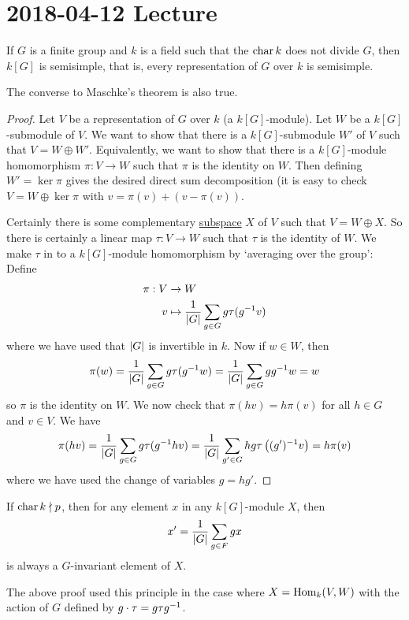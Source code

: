 \section{2018-04-12 Lecture}

\begin{thm}
	If $G$ is a finite group and $k$ is a field such that the $\operatorname{char} k$ does not divide $G$, then $k[G]$ is semisimple, that is, every representation of $G$ over $k$ is semisimple.
\end{thm}

\begin{rmk}
	The converse to Maschke's theorem is also true.
\end{rmk}

\begin{proof}
	Let $V$ be a representation of $G$ over $k$ (a $k[G]$-module).
	Let $W$ be a $k[G]$-submodule of $V$.
	We want to show that there is a $k[G]$-submodule $W'$ of $V$ such that $V=W\oplus W'$.
	Equivalently, we want to show that there is a $k[G]$-module homomorphism $\pi: V \to W$ such that $\pi$ is the identity on $W$.
	Then defining $W'=\ker\pi$ gives the desired direct sum decomposition (it is easy to check $V=W\oplus\ker\pi$ with $v=\pi(v)+(v-\pi(v))$.
	
	Certainly there is some complementary \underline{subspace} $X$ of $V$ such that $V=W\oplus X$.
	So there is certainly a linear map $\tau:V \to W$ such that $\tau$ is the identity of $W$.
	We make $\tau$ in to a $k[G]$-module homomorphism by `averaging over the group':
	Define
	\begin{align*}
		\pi: V &\to W \\
		v &\mapsto \frac 1{\left\lvert G \right\rvert} \sum_{g \in G} g \tau(g^{-1} v)
	\end{align*}
	where we have used that $\left\lvert G \right\rvert$ is invertible in $k$.	
	Now if $w \in W$, then
	\[\pi(w) = \frac 1{\left\lvert G \right\rvert} \sum_{g \in G} g\tau(g^{-1} w) = \frac 1{\left\lvert G \right\rvert} \sum_{g \in G} gg^{-1} w = w \]
	so $\pi$ is the identity on $W$.
	We now check that $\pi(hv)=h\pi(v)$ for all $h \in G$ and $v \in V$.
	We have
	\[\pi(hv) = \frac 1{\left\lvert G \right\rvert} \sum_{g \in G} g\tau(g^{-1} hv) = \frac 1{\left\lvert G \right\rvert} \sum_{g' \in G} hg\tau\left((g')^{-1} v\right) = h\pi(v)\]
	where we have used the change of variables $g=hg'$.
\end{proof}

\begin{rmk}
	If $\operatorname{char} k \nmid p$, then for any element $x$ in any $k[G]$-module $X$, then
	\[x' = \frac 1{\left\lvert G \right\rvert} \sum_{g \in F} gx\]
	is always a $G$-invariant element of $X$.
	
	The above proof used this principle in the case where $X=\operatorname{Hom}_k(V,W)$ with the action of $G$ defined by $g \cdot\tau = g\tau g^{-1}$.
\end{rmk}

